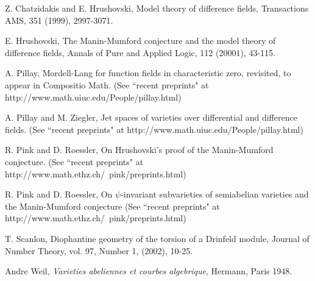 \begin{thebibliography}{99}

 Z. Chatzidakis
and E. Hrushovski, Model theory of difference
fields, Transactions AMS, 351 (1999),
2997-3071.


 E. Hrushovski, The
Manin-Mumford conjecture and the model theory
of difference fields, Annals of Pure and
Applied Logic, 112 (20001), 43-115.

 A. Pillay, Mordell-Lang for
function fields in characteristic zero,
revisited, to appear in Compositio Math. (See
``recent preprints" at
http://www.math.uiuc.edu/People/pillay.html)

 A. Pillay and M.
Ziegler, Jet spaces of varieties over
differential and difference fields. (See
``recent preprints" at
http://www.math.uiuc.edu/People/pillay.html)

 R. Pink and D.
Roessler, On Hrushovski's proof of the
Manin-Mumford conjecture. (See ``recent
preprints" at
http://www.math.ethz.ch/~pink/preprints.html)

 R. Pink and D.
Roessler, On $\psi$-invariant subvarieties of
semiabelian varieties and the Manin-Mumford
conjecture (See ``recent preprints" at
http://www.math.ethz.ch/~pink/preprints.html)

 T. Scanlon, Diophantine
geometry of the torsion of a Drinfeld module,
Journal of Number Theory, vol. 97, Number 1,
(2002), 10-25.

 Andre Weil, {\em
Varieties abeliennes et courbes algebrique},
Hermann, Paris 1948.
\end{thebibliography}


